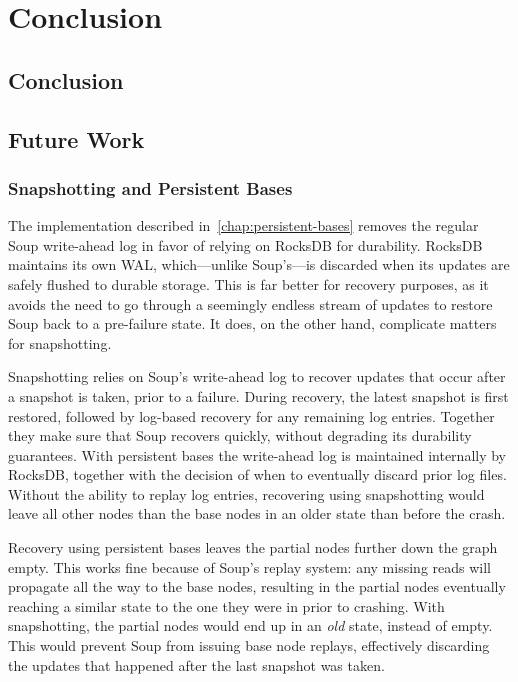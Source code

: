 \chapter{Conclusion}\label{chap:conclusion}

\section{Conclusion}


\section{Future Work}\label{sec:future-work}

\subsection{Snapshotting and Persistent Bases}

The  implementation described
in~\ref{chap:persistent-bases} removes the regular Soup write-ahead log in favor
of relying on RocksDB for durability. RocksDB maintains its own WAL,
which---unlike Soup's---is discarded when its updates are safely flushed to
durable storage. This is far better for recovery purposes, as it avoids the need
to go through a seemingly endless stream of updates to restore Soup back to a
pre-failure state. It does, on the other hand, complicate matters for
snapshotting.

Snapshotting relies on Soup's write-ahead log to recover updates that occur
after a snapshot is taken, prior to a failure. During recovery, the latest
snapshot is first restored, followed by log-based recovery for any remaining log
entries. Together they make sure that Soup recovers quickly, without degrading
its durability guarantees. With persistent bases the write-ahead log is
maintained internally by RocksDB, together with the decision of when to
eventually discard prior log files. Without the ability to replay log entries,
recovering using snapshotting would leave all other nodes than the base nodes in
an older state than before the crash.

Recovery using persistent bases leaves the partial nodes further down the graph
empty. This works fine because of Soup's replay system: any missing reads will
propagate all the way to the base nodes, resulting in the partial nodes
eventually reaching a similar state to the one they were in prior to crashing.
With snapshotting, the partial nodes would end up in an \textit{old} state,
instead of empty. This would prevent Soup from issuing base node replays,
effectively discarding the updates that happened after the last snapshot was
taken.

